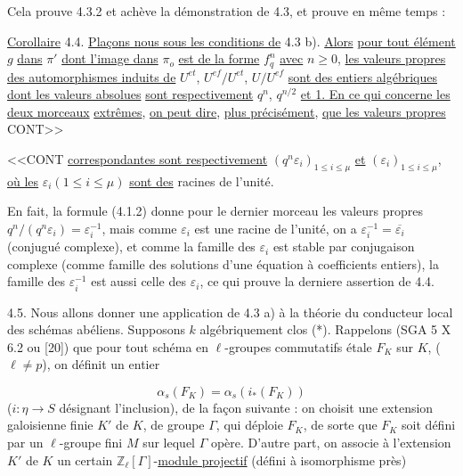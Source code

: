 Cela prouve 4.3.2 et achève la démonstration de 4.3, et prouve en même temps :

\underline{Corollaire} 4.4. \underline{Plaçons nous sous les conditions de} 4.3 b). \underline{Alors} \underline{pour tout élément} $g$ \underline{dans} $\pi'$ \underline{dont l'image dans} $\pi_o$ \underline{est de la forme} $f_q^n$ \underline{avec} $n \geq 0$, \underline{les valeurs propres des automorphismes induits de} $U^{et}$, $U^{ef}/U^{et}$, $U/U^{ef}$ \underline{sont des entiers algébriques dont les valeurs absolues} \underline{sont respectivement} $q^n$, $q^{n/2}$ \underline{et 1. En ce qui concerne les deux morceaux} \underline{extrêmes}, \underline{on peut dire}, \underline{plus précisément}, \underline{que les valeurs propres} CONT>>



<<CONT \underline{correspondantes sont respectivement} $(q^n\varepsilon_i)_{1\leq i\leq\mu}$ \underline{et} $(\varepsilon_i)_{1\leq i\leq\mu}$, \underline{où les} $\varepsilon_i(1\leq i\leq\mu)$ \underline{sont des} racines de l'unité.

En fait, la formule (4.1.2) donne pour le dernier morceau les valeurs propres $q^n/(q^n\varepsilon_i) = \varepsilon_i^{-1}$, mais comme $\varepsilon_i$ est une racine de l'unité, on a $\varepsilon_i^{-1} = \overline{\varepsilon_i}$ (conjugué complexe), et comme la famille des $\varepsilon_i$ est stable par conjugaison complexe (comme famille des solutions d'une équation à coefficients entiers), la famille des $\varepsilon_i^{-1}$ est aussi celle des $\varepsilon_i$, ce qui prouve la derniere assertion de 4.4.

4.5. Nous allons donner une application de 4.3 a) à la théorie du conducteur local des schémas abéliens. Supposons $k$ algébriquement clos (*). Rappelons (SGA 5 X 6.2 ou [20]) que pour tout schéma en $\ell$-groupes commutatifs étale $F_K$ sur $K$, ($\ell \neq p$), on définit un entier

\begin{equation}\tag{4.5.1}
\alpha_s(F_K) = \alpha_s(i_*(F_K))
\end{equation}
($i : \eta \longrightarrow S$ désignant l'inclusion), de la façon suivante : on choisit une extension galoisienne finie $K'$ de $K$, de groupe $\Gamma$, qui déploie $F_K$, de sorte que $F_K$ soit défini par un $\ell$-groupe fini $M$ sur lequel $\Gamma$ opère. D'autre part, on associe à l'extension $K'$ de $K$ un certain $\mathbb{Z}_\ell[\Gamma]$-\underline{module projectif} (défini à isomorphisme près)

